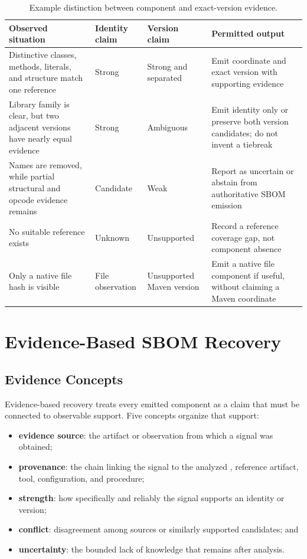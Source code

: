 \begin{table}[H]
\centering
\caption{Example distinction between component and exact-version evidence.}
\label{tab:pfe-background-identity-version}
\begin{tabularx}{\textwidth}{L{0.23\textwidth}L{0.20\textwidth}XX}
\toprule
\textbf{Observed situation} & \textbf{Identity claim} &
\textbf{Version claim} & \textbf{Permitted output}\\
\midrule
Distinctive classes, methods, literals, and structure match one reference &
Strong & Strong and separated & Emit coordinate and exact version with
supporting evidence\\
Library family is clear, but two adjacent versions have nearly equal evidence
& Strong & Ambiguous & Emit identity only or preserve both version candidates;
do not invent a tiebreak\\
Names are removed, while partial structural and opcode evidence remains &
Candidate & Weak & Report as uncertain or abstain from authoritative SBOM
emission\\
No suitable reference exists & Unknown & Unsupported & Record a reference
coverage gap, not component absence\\
Only a native file hash is visible & File observation & Unsupported Maven
version & Emit a native file component if useful, without claiming a Maven
coordinate\\
\bottomrule
\end{tabularx}
\end{table}

\section{Evidence-Based SBOM Recovery}

\subsection{Evidence Concepts}

Evidence-based recovery treats every emitted component as a claim that must be
connected to observable support. Five concepts organize that support:

\begin{itemize}
  \item \textbf{evidence source}: the artifact or observation from which a
  signal was obtained;
  \item \textbf{provenance}: the chain linking the signal to the analyzed
  \APK, reference artifact, tool, configuration, and procedure;
  \item \textbf{strength}: how specifically and reliably the signal supports
  an identity or version;
  \item \textbf{conflict}: disagreement among sources or similarly supported
  candidates; and
  \item \textbf{uncertainty}: the bounded lack of knowledge that remains after
  analysis.
\end{itemize}

